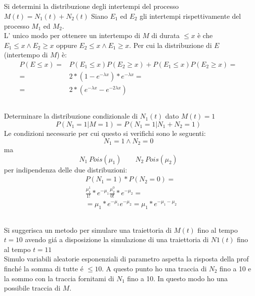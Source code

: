 \documentclass[a4paper]{article}
\begin{document}
\subsection{}
Si determini la distribuzione degli intertempi del processo $M (t) = N_1 (t) + N_2 (t)$
Siano $E_1$ ed $E_2$ gli intertempi rispettivamente del processo $M_1$ ed $M_2$.\\
L' unico modo per ottenere un intertempo di $M$ di durata $\leq x$ è che $E_1 \leq x \wedge E_2 \geq x$ oppure $E_2 \leq x \wedge E_1 \geq x$.
Per cui la distribuzione di $E$ (intertempo di $M$) è:
\begin{align*}
	P(E \leq x) =& P(E_1 \leq x) P(E_2 \geq x) + P(E_1 \leq x)P(E_2 \geq x)=\\
	=&2 * (1-e^{-\lambda x}) * e^{-\lambda x}=\\
	=& 2 * (e^{-\lambda x} - e^{-2\lambda x})
\end{align*}

\subsection{}
Determinare la distribuzione condizionale di $N_1 (t)$ dato $ M (t) = 1$
$$P(N_1 = 1 | M = 1) = P (N_1 = 1 | N_1 + N_2 = 1)$$
Le condizioni necessarie per cui questo si verifichi sono le seguenti:
$$N_1 = 1 \wedge N_2 = 0$$
ma 
$$N_1 ~ Pois(\mu_1) \qquad N_2 ~ Pois(\mu_2)$$
per indipendenza delle due distribuzioni:
\begin{align*}
	&P(N_1 = 1) * P(N_2 = 0) = \\
	&\frac{\mu_1^1}{1!}*e^{-\mu_1}\frac{\mu_2^0}{0!}*e^{-\mu_2}=\\
	&= \mu_1*e^{-\mu_1}e^{-\mu_2}= \mu_1*e^{-\mu_1-\mu_2}
\end{align*}

\subsection{}
Si suggerisca un metodo per simulare una traiettoria di $M (t)$ fino al tempo $ t = 10$ avendo giá a disposizione la simulazione di una traiettoria di $ N1 (t) $ fino al tempo $ t = 11$\\

Simulo variabili aleatorie esponenziali di parametro {{aspetta la risposta della prof}} finché la somma di tutte é $\leq 10$.
A questo punto ho una traccia di $N_2$ fino a 10 e la sommo con la traccia fornitami di $N_1$ fino a 10.
In questo modo ho una possibile traccia di $M$.
\end{document}
